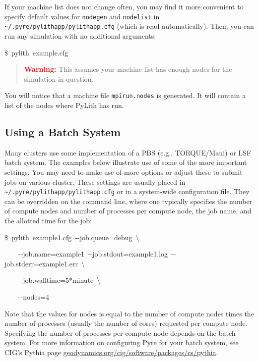 If your machine list does not change often, you may find it more convenient
to specify default values for \texttt{nodegen} and \texttt{nodelist}
in \texttt{\textasciitilde{}/.pyre/pylithapp/pylithapp.cfg} (which
is read automatically). Then, you can run any simulation with no additional
arguments:
\begin{lyxcode}
\$~pylith~example.cfg\end{lyxcode}
\begin{quote}
\textbf{\textcolor{red}{Warning:}}\textbf{ }This assumes your machine
list has enough nodes for the simulation in question.
\end{quote}
You will notice that a machine file \texttt{mpirun.nodes} is generated.
It will contain a list of the nodes where PyLith has run.


\subsection{Using a Batch System}

Many clusters use some implementation of a PBS (e.g., TORQUE/Maui)
or LSF batch system. The examples below illustrate use of some of
the more important settings. You may need to make use of more options
or adjust these to submit jobs on various cluster. These settings
are usually placed in \texttt{\textasciitilde{}/.pyre/pylithapp/pylithapp.cfg}
or in a system-wide configuration file. They can be overridden on
the command line, where one typically specifies the number of compute
nodes and number of processes per compute node, the job name, and
the allotted time for the job:
\begin{lyxcode}
\$~pylith~example1.cfg~-{}-job.queue=debug~\textbackslash{}

~~~~-{}-job.name=example1~-{}-job.stdout=example1.log~-{}-job.stderr=example1.err~\textbackslash{}

~~~~-{}-job.walltime=5{*}minute~\textbackslash{}

~~~~-{}-nodes=4
\end{lyxcode}
Note that the values for nodes is equal to the number of compute nodes
times the number of processes (usually the number of cores) requested
per compute node. Specifying the number of processes per compute node
depends on the batch system. For more information on configuring Pyre
for your batch system, see CIG's Pythia page \url{geodynamics.org/cig/software/packages/cs/pythia}.


